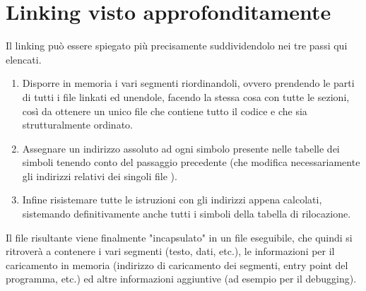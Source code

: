 \documentclass[class=book, crop=false, oneside]{standalone}
\begin{document}
\section{Linking visto approfonditamente}
Il linking può essere spiegato più precisamente suddividendolo nei tre passi qui elencati.
\begin{enumerate}
	\item Disporre in memoria i vari segmenti riordinandoli, ovvero prendendo le parti  di tutti i file  linkati ed unendole, facendo la stessa cosa con tutte le sezioni, così da ottenere un unico file  che contiene tutto il codice e che sia strutturalmente ordinato.
	\item Assegnare un indirizzo assoluto ad ogni simbolo presente nelle tabelle dei simboli tenendo conto del passaggio precedente (che modifica necessariamente gli indirizzi relativi dei singoli file ).
	\item Infine risistemare tutte le istruzioni con gli indirizzi appena calcolati, sistemando definitivamente anche tutti i simboli della tabella di rilocazione.
\end{enumerate}
Il file risultante viene finalmente "incapsulato" in un file eseguibile, che quindi si ritroverà a contenere i vari segmenti (testo, dati, etc.), le informazioni per il caricamento in memoria (indirizzo di caricamento dei segmenti, entry point del programma, etc.) ed altre informazioni aggiuntive (ad esempio per il debugging).
\end{document}

